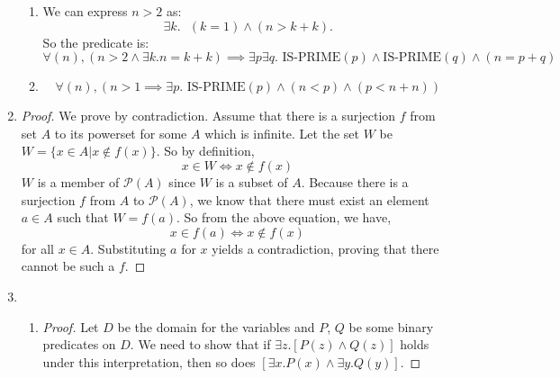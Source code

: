 \documentclass[11pt]{article}
\begin{document}
\begin{enumerate}
\begin{enumerate}
  \item
    We can express $n > 2$ as:
    \begin{equation}
      \exists{k}. \text{ }(k = 1) \land (n > k+k).
    \end{equation}
    So the predicate is:
    \begin{equation}
      \forall(n), (n > 2 \land \exists{k}. n=k+k) \implies
      \exists{p}\exists{q}. \text{ IS-PRIME}(p) \land \text{
        IS-PRIME}(q) \land (n = p + q) 
    \end{equation}

  \item
    \begin{equation}
      \forall(n), (n > 1 \implies
      \exists{p}. \text{ IS-PRIME}(p) \land (n < p) \land (p < n+n))
    \end{equation}

  \end{enumerate}

\item %
  \begin{proof}
    We prove by contradiction. Assume that there is a surjection $f$ from
    set $A$ to its powerset for some $A$ which is infinite. Let the
    set $W$ be $W=\{x \in A | x \notin f(x) \}$. So by definition,
    \begin{equation}
      x \in W \iff x \notin f(x)
    \end{equation}
    $W$ is a member of $\mathcal{P}(A)$ since $W$
    is a subset of $A$. Because there is a surjection $f$ from $A$ to
    $\mathcal{P}(A)$, we know that there must exist an element $a \in
    A$ such that $W=f(a)$. So from the above equation, we have,
    \begin{equation}
      x \in f(a) \iff x \notin f(x)
    \end{equation}
    for all $x \in A$.
    Substituting $a$ for $x$ yields a contradiction, proving that
    there cannot be such a $f$. 
  \end{proof}

\item %
\begin{enumerate}
\item
  \begin{proof}
  Let $D$ be the domain for the variables and $P$, $Q$ be some binary
  predicates on $D$. We need to show that if $\exists{z}. [P(z) \land
    Q(z)]$ holds under this interpretation, then so does $[\exists{x}. P(x)
    \land \exists{y}. Q(y)]$.


\end{proof}
\end{enumerate}
\end{enumerate}
\end{document}
